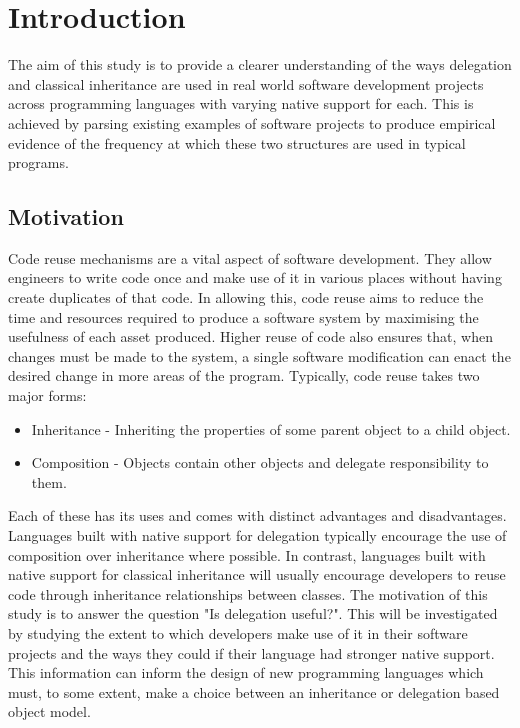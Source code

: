 \chapter{Introduction}\label{C:intro}
The aim of this study is to provide a clearer understanding of the ways delegation and classical inheritance are used in real world software development projects across programming languages with varying native support for each. This is achieved by parsing existing examples of software projects to produce empirical evidence of the frequency at which these two structures are used in typical programs.

\section{Motivation}
Code reuse mechanisms are a vital aspect of software development. They allow engineers to write code once and make use of it in various places without having create duplicates of that code. In allowing this, code reuse aims to reduce the time and resources required to produce a software system by maximising the usefulness of each asset produced. Higher reuse of code also ensures that, when changes must be made to the system, a single software modification can enact the desired change in more areas of the program.
\newline
Typically, code reuse takes two major forms:
\begin{itemize}
	\item Inheritance - Inheriting the properties of some parent object to a child object.
	\item Composition - Objects contain other objects and delegate responsibility to them.
\end{itemize}
Each of these has its uses and comes with distinct advantages and disadvantages. Languages built with native support for delegation typically encourage the use of composition over inheritance where possible. In contrast, languages built with native support for classical inheritance will usually encourage developers to reuse code through inheritance relationships between classes.
\newline
The motivation of this study is to answer the question "Is delegation useful?". This will be investigated by studying the extent to which developers make use of it in their software projects and the ways they could if their language had stronger native support. This information can inform the design of new programming languages which must, to some extent, make a choice between an inheritance or delegation based object model.

